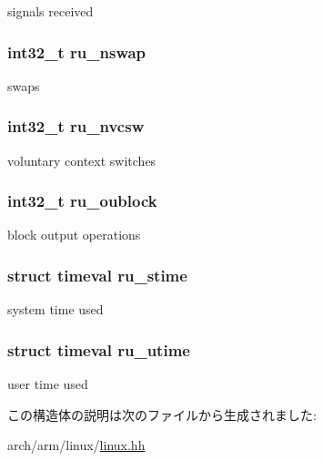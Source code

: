 signals received \hypertarget{structArmLinux32_1_1rusage_a2e028ef07873989257f0cb9021e977a0}{
\subsubsection[{ru\_\-nswap}]{\setlength{\rightskip}{0pt plus 5cm}int32\_\-t {\bf ru\_\-nswap}}}
\label{structArmLinux32_1_1rusage_a2e028ef07873989257f0cb9021e977a0}


swaps \hypertarget{structArmLinux32_1_1rusage_a4e4a95ffb77259342e5f01dba936ff65}{
\subsubsection[{ru\_\-nvcsw}]{\setlength{\rightskip}{0pt plus 5cm}int32\_\-t {\bf ru\_\-nvcsw}}}
\label{structArmLinux32_1_1rusage_a4e4a95ffb77259342e5f01dba936ff65}


voluntary context switches \hypertarget{structArmLinux32_1_1rusage_ac5571605e8ae584a7640fb33c8300af0}{
\subsubsection[{ru\_\-oublock}]{\setlength{\rightskip}{0pt plus 5cm}int32\_\-t {\bf ru\_\-oublock}}}
\label{structArmLinux32_1_1rusage_ac5571605e8ae584a7640fb33c8300af0}


block output operations \hypertarget{structArmLinux32_1_1rusage_a15f836efd7b69c0a0eb19f5d9505e3e9}{
\subsubsection[{ru\_\-stime}]{\setlength{\rightskip}{0pt plus 5cm}struct {\bf timeval} {\bf ru\_\-stime}}}
\label{structArmLinux32_1_1rusage_a15f836efd7b69c0a0eb19f5d9505e3e9}


system time used \hypertarget{structArmLinux32_1_1rusage_a40e27c5d4340b0c6532787d6740b22ab}{
\subsubsection[{ru\_\-utime}]{\setlength{\rightskip}{0pt plus 5cm}struct {\bf timeval} {\bf ru\_\-utime}}}
\label{structArmLinux32_1_1rusage_a40e27c5d4340b0c6532787d6740b22ab}


user time used 

この構造体の説明は次のファイルから生成されました:\begin{DoxyCompactItemize}
\item 
arch/arm/linux/\hyperlink{arch_2arm_2linux_2linux_8hh}{linux.hh}\end{DoxyCompactItemize}

